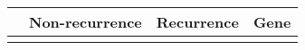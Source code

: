 \begin{tabular}{lccr}
\toprule
{} & Non-recurrence & Recurrence & Gene \\
\midrule
{} &                &            &      \\
\bottomrule
\end{tabular}
